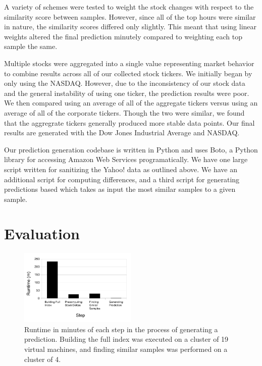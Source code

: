 \documentclass[twocolumn]{article}
\begin{document}
A variety of schemes were tested to weight the stock changes with respect to the similarity score between samples. However, since all of the top hours were similar in nature, the similarity scores differed only slightly. This meant that using linear weights altered the final prediction minutely compared to weighting each top sample the same. 

Multiple stocks were aggregated into a single value representing market behavior to combine results across all of our collected stock tickers. We initially began by only using the NASDAQ. However, due to the inconsistency of our stock data and the general instability of using one ticker, the prediction results were poor. We then compared using an average of all of the aggregate tickers versus using an average of all of the corporate tickers. Though the two were similar, we found that the aggregrate tickers generally produced more stable data points. Our final results are generated with the Dow Jones Industrial Average and NASDAQ.

Our prediction generation codebase is written in Python and uses Boto, a Python library for accessing Amazon Web Services programatically. We have one large script written for sanitizing the Yahoo! data as outlined above. We have an additional script for computing differences, and a third script for generating predictions based which takes as input the most similar samples to a given sample.

\section{Evaluation}

\begin{figure}
\centering
\includegraphics[width=0.5\textwidth]{runtime}
\caption{Runtime in minutes of each step in the process of generating a prediction. Building the full index was executed on a cluster of 19 virtual machines, and finding similar samples was performed on a cluster of 4.}
\label{runtime}
\end{figure}
\end{document}
